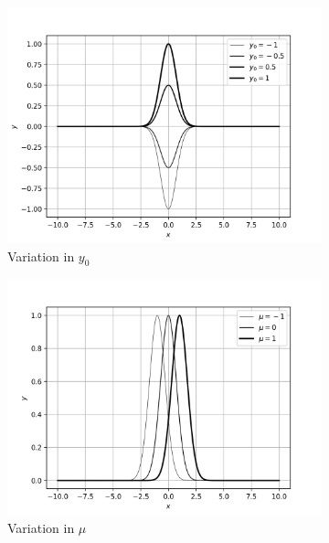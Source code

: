 \documentclass[12]{article}
\begin{document}
    \begin{figure}[H]
        \centering
        \begin{subfigure}[t!]{0.49\textwidth}
            \centering
            \includegraphics[width=\textwidth]{plots/q3p1.png}
            \caption{Variation in $y_0$}
            \label{fig:q3p1}
        \end{subfigure}
        \hfill
        \begin{subfigure}[t!]{0.49\textwidth}
            \centering
            \includegraphics[width=\textwidth]{plots/q3p2.png}
            \caption{Variation in $\mu$}
            \label{fig:q3p2}
        \end{subfigure}
        \begin{subfigure}[b!]{0.49\textwidth}

\end{subfigure}
\end{figure}
\end{document}
